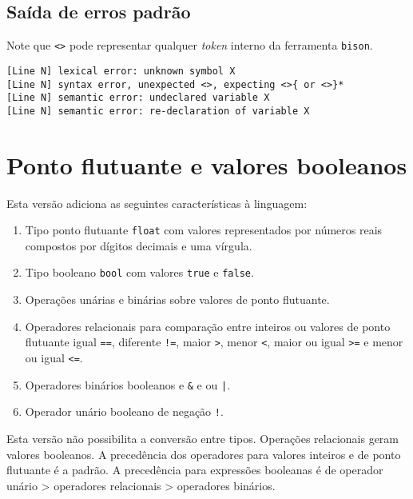 \documentclass{article}
\newenvironment{smallenum}{
    \vspace{-1mm}
    \begin{enumerate}[label=\roman*.]
    \setlength{\parskip}{0pt}
    \setlength{\itemsep}{2pt}
}{
    \vspace{-2mm}
    \end{enumerate}
}
\begin{document}
\subsection{Saída de erros padrão}

Note que \texttt{<>} pode representar qualquer \emph{token} interno da
ferramenta \texttt{bison}.

\begin{verbatim}
[Line N] lexical error: unknown symbol X
[Line N] syntax error, unexpected <>, expecting <>{ or <>}*
[Line N] semantic error: undeclared variable X
[Line N] semantic error: re-declaration of variable X
\end{verbatim}

\section{Ponto flutuante e valores booleanos}

Esta versão adiciona as seguintes características à linguagem:

\begin{smallenum}

\item Tipo ponto flutuante \texttt{float} com valores representados por
    números reais compostos por dígitos decimais e uma vírgula.

\item Tipo booleano \texttt{bool} com valores \texttt{true} e
    \texttt{false}.

\item Operações unárias e binárias sobre valores de ponto flutuante.

\item Operadores relacionais para comparação entre inteiros ou valores de
    ponto flutuante igual \texttt{==}, diferente \texttt{!=},
    maior \texttt{>}, menor \texttt{<}, maior ou igual \texttt{>=} e
    menor ou igual \texttt{<=}.

\item Operadores binários booleanos e \texttt{\&} e ou \texttt{|}.

\item Operador unário booleano de negação \texttt{!}.

\end{smallenum}

Esta versão não possibilita a conversão entre tipos. Operações relacionais
geram valores booleanos. A precedência dos operadores para valores inteiros e
de ponto flutuante é a padrão. A precedência para expressões booleanas é de
operador unário > operadores relacionais > operadores binários.
\end{document}
